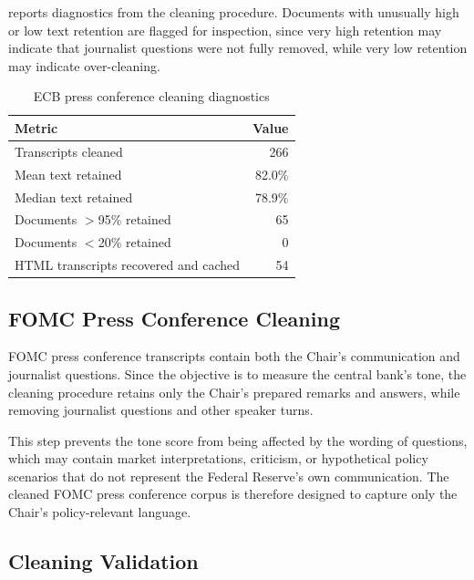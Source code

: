  reports diagnostics from the cleaning
procedure. Documents with unusually high or low text retention are flagged
for inspection, since very high retention may indicate that journalist
questions were not fully removed, while very low retention may indicate
over-cleaning.

\begin{table}[htbp]
\centering
\caption{ECB press conference cleaning diagnostics}
\label{tab:ecb_pc_cleaning}
\begin{tabular}{lr}
\toprule
Metric & Value \\
\midrule
Transcripts cleaned                         & 266 \\
Mean text retained                          & 82.0\% \\
Median text retained                        & 78.9\% \\
Documents $>$95\% retained                  & 65 \\
Documents $<$20\% retained                  & 0 \\
HTML transcripts recovered and cached       & 54 \\
\bottomrule
\end{tabular}
\end{table}

\subsection{FOMC Press Conference Cleaning}
\label{sec:data_fomc_pc_clean}

FOMC press conference transcripts contain both the Chair's communication
and journalist questions. Since the objective is to measure the central
bank's tone, the cleaning procedure retains only the Chair's prepared
remarks and answers, while removing journalist questions and other
speaker turns.

This step prevents the tone score from being affected by the wording of
questions, which may contain market interpretations, criticism, or
hypothetical policy scenarios that do not represent the Federal Reserve's
own communication. The cleaned FOMC press conference corpus is therefore
designed to capture only the Chair's policy-relevant language.

\subsection{Cleaning Validation}
\label{sec:data_cleaning_validation}

